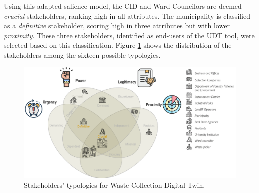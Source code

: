 \documentclass[authoryear,preprint,review,11pt,doubleblind]{elsarticle}
\begin{document}

    


    Using this adapted salience model, the CID and Ward Councilors are deemed \textit{crucial} stakeholders, ranking high in all attributes. The municipality is classified as a \textit{definitive} stakeholder, scoring high in three attributes but with lower \textit{proximity}. These three stakeholders, identified as end-users of the UDT tool, were selected based on this classification. Figure \ref{fig:typologies} shows the distribution of the stakeholders among the sixteen possible typologies.

    \begin{figure}[htb]
    \centering
    \includegraphics[width=1.2\linewidth]{Figures/Stakeholders map.png}
        \caption{Stakeholders’ typologies for Waste Collection Digital Twin.}
        \label{fig:typologies}
    \end{figure}
\end{document}
